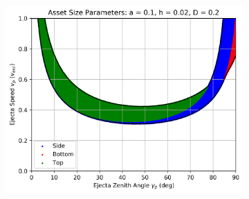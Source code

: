 \documentclass{article}
\begin{document}
\begin{figure}
	\begin{subfigure}[t]{.32\textwidth}
		\centering
		\includegraphics[width=.98\linewidth]{asset_speed_zenith_plot_1.010e+00_1.000e-01_2.000e-02_2.000e-01.png}  
		\label{fig:sub-asset_speed_zenith_h1_9}
	\end{subfigure}
	

\end{figure}
\end{document}
